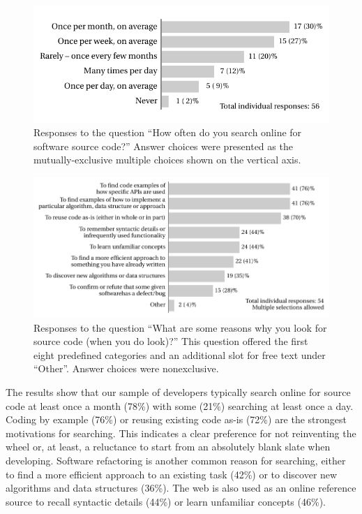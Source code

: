 \documentclass{casicswhitepaper}
\begin{document}
\begin{figure}[bht]
  \centering
  \includegraphics[scale=0.9]{files/plots/bar-graph-how-often-src.pdf}
  \vspace*{-3ex}
  \caption{Responses to the question  ``How often do you search online for software source code?''  Answer choices were presented as the mutually-exclusive multiple choices shown on the vertical axis.}
  \label{how-often-search-for-src}
\end{figure}

\begin{figure}[b]
  \centering
  \includegraphics[width=5.6in]{files/plots/bar-graph-why-search-for-src.pdf}
  \vspace*{-2ex}
  \caption{Responses to the question ``What are some reasons why you look for source code (when you do look)?''  This question offered the first eight predefined categories and an additional slot for free text under ``Other''.  Answer choices were nonexclusive.}
  \label{why-search-for-src}
\end{figure}

The results show that our sample of developers typically search online for source code at least once a month (78\%) with some (21\%) searching at least once a day. Coding by example (76\%) or reusing existing code as-is (72\%) are the strongest motivations for searching. This indicates a clear preference for not reinventing the wheel or, at least, a reluctance to start from an absolutely blank slate when developing. Software refactoring is another common reason for searching, either to find a more efficient approach to an existing task (42\%) or to discover new algorithms and data structures (36\%). The web is also used as an online reference source to recall syntactic details (44\%) or learn unfamiliar concepts (46\%). 
\end{document}
